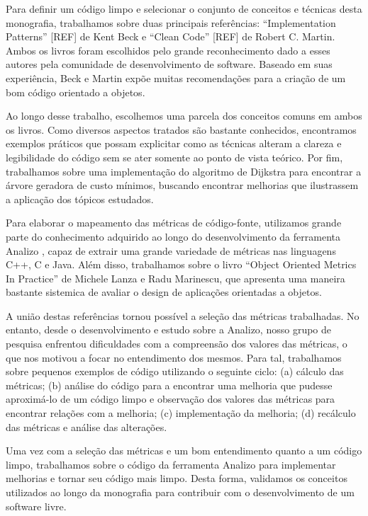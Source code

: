 Para definir um código limpo e selecionar o conjunto de conceitos e técnicas desta monografia, trabalhamos sobre duas principais referências: 
``Implementation Patterns'' [REF] \cite{} de Kent Beck e ``Clean Code'' [REF] \cite{} de Robert C. Martin. Ambos os livros foram escolhidos 
pelo grande reconhecimento dado a esses autores pela comunidade de desenvolvimento de software. Baseado em suas experiência, Beck e Martin 
expõe muitas recomendações para a criação de um bom código orientado a objetos.

Ao longo desse trabalho, escolhemos uma parcela dos conceitos comuns em ambos os livros. Como diversos aspectos tratados são bastante 
conhecidos, encontramos exemplos práticos que possam explicitar como as técnicas alteram a clareza e legibilidade do código sem se ater 
somente ao ponto de vista teórico. Por fim, trabalhamos sobre uma implementação do algoritmo de Dijkstra para encontrar a árvore geradora de 
custo mínimos, buscando encontrar melhorias que ilustrassem a aplicação dos tópicos estudados.

Para elaborar o mapeamento das métricas de código-fonte, utilizamos grande parte do conhecimento adquirido ao longo do desenvolvimento da 
ferramenta Analizo \cite{}, capaz de extrair uma grande variedade de métricas nas linguagens C++, C e Java. Além disso, trabalhamos sobre o 
livro ``Object Oriented Metrics In Practice'' \cite{} de Michele Lanza e Radu Marinescu, que apresenta uma maneira bastante sistemica de avaliar o design de aplicações orientadas a objetos. 

A união destas referências tornou possível a seleção das métricas trabalhadas. No entanto, desde o desenvolvimento e estudo sobre a Analizo, nosso grupo de pesquisa enfrentou dificuldades com a compreensão dos valores das métricas, o que nos motivou a focar no entendimento dos mesmos. Para tal, trabalhamos sobre pequenos exemplos de código utilizando o seguinte ciclo: (a) cálculo das métricas; (b) análise do código para a encontrar uma melhoria que pudesse aproximá-lo de um código limpo e observação dos valores das métricas para encontrar relações com a melhoria; (c) implementação da melhoria; (d) recálculo das métricas e análise das alterações.

Uma vez com a seleção das métricas e um bom entendimento quanto a um código limpo, trabalhamos sobre o código da ferramenta Analizo para implementar melhorias e tornar seu código mais limpo. Desta forma, validamos os conceitos utilizados ao longo da monografia para contribuir com o desenvolvimento de um software livre.

